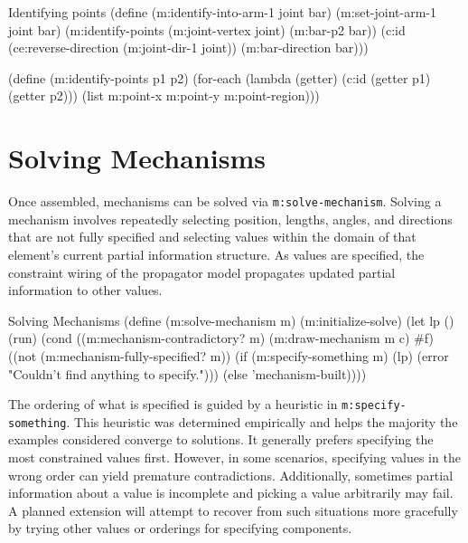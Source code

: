\begin{code-listing}
[label=identifying-points]
{Identifying points}
(define (m:identify-into-arm-1 joint bar)
  (m:set-joint-arm-1 joint bar)
  (m:identify-points (m:joint-vertex joint) (m:bar-p2 bar))
  (c:id (ce:reverse-direction (m:joint-dir-1 joint))
        (m:bar-direction bar)))

(define (m:identify-points p1 p2)
  (for-each (lambda (getter)
              (c:id (getter p1) (getter p2)))
            (list m:point-x m:point-y m:point-region)))
\end{code-listing}

\section{Solving Mechanisms}

Once assembled, mechanisms can be solved via
\texttt{m:solve-mechanism}. Solving a mechanism involves repeatedly
selecting position, lengths, angles, and directions that are not fully
specified and selecting values within the domain of that element's
current partial information structure. As values are specified, the
constraint wiring of the propagator model propagates updated partial
information to other values.


\begin{code-listing}
[label=solve-mechanism]
{Solving Mechanisms}
(define (m:solve-mechanism m)
  (m:initialize-solve)
  (let lp ()
    (run)
    (cond ((m:mechanism-contradictory? m)
           (m:draw-mechanism m c)
           #f)
          ((not (m:mechanism-fully-specified? m))
           (if (m:specify-something m)
               (lp)
               (error "Couldn't find anything to specify.")))
          (else 'mechanism-built))))
\end{code-listing}

The ordering of what is specified is guided by a heuristic in
\texttt{m:specify-something}. This heuristic was determined
empirically and helps the majority the examples considered converge to
solutions. It generally prefers specifying the most constrained values
first. However, in some scenarios, specifying values in the wrong
order can yield premature contradictions. Additionally, sometimes
partial information about a value is incomplete and picking a value
arbitrarily may fail. A planned extension will attempt to recover from
such situations more gracefully by trying other values or orderings
for specifying components.

